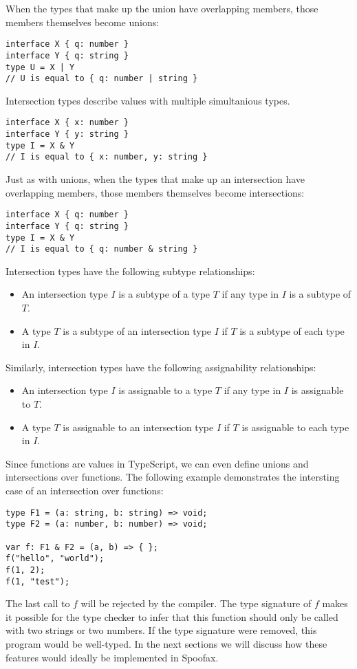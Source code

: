 When the types that make up the union have overlapping members, those members themselves become unions:
\begin{lstlisting}
interface X { q: number }
interface Y { q: string }
type U = X | Y
// U is equal to { q: number | string }
\end{lstlisting}
\bigskip
Intersection types describe values with multiple simultanious types. 
\begin{lstlisting}
interface X { x: number }
interface Y { y: string }
type I = X & Y
// I is equal to { x: number, y: string }
\end{lstlisting}

Just as with unions, when the types that make up an intersection have overlapping members, those members themselves become intersections:
\begin{lstlisting}
interface X { q: number }
interface Y { q: string }
type I = X & Y
// I is equal to { q: number & string }
\end{lstlisting}

Intersection types have the following subtype relationships:
\begin{itemize}
\item An intersection type $I$ is a subtype of a type $T$ if any type in $I$ is a subtype of $T$.
\item A type $T$ is a subtype of an intersection type $I$ if $T$ is a subtype of each type in $I$.
\end{itemize}
Similarly, intersection types have the following assignability relationships:
\begin{itemize}
\item An intersection type $I$ is assignable to a type $T$ if any type in $I$ is assignable to $T$.
\item A type $T$ is assignable to an intersection type $I$ if $T$ is assignable to each type in $I$.
\end{itemize}
\bigskip
Since functions are values in TypeScript, we can even define unions and intersections over functions.
The following example demonstrates the intersting case of an intersection over functions:
\begin{lstlisting}
type F1 = (a: string, b: string) => void;  
type F2 = (a: number, b: number) => void;

var f: F1 & F2 = (a, b) => { };  
f("hello", "world");
f(1, 2);
f(1, "test");
\end{lstlisting}

The last call to $f$ will be rejected by the compiler.
The type signature of $f$ makes it possible for the type checker to infer
that this function should only be called with two strings or two numbers.
If the type signature were removed, this program would be well-typed.
\bigskip
In the next sections we will discuss how these features would ideally be implemented in Spoofax.

